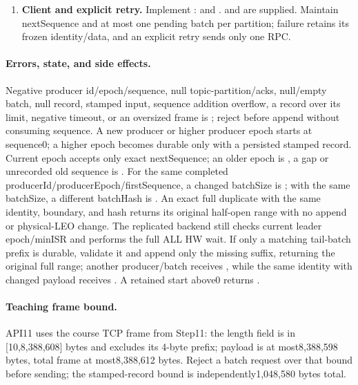 \begin{enumerate}
\item \textbf{Client and explicit retry.} Implement :  and .  and  are supplied. Maintain nextSequence and at most one pending batch per partition; failure retains its frozen identity/data, and an explicit retry sends only one RPC.
\end{enumerate}
\paragraph{Errors, state, and side effects.}Negative producer id/epoch/sequence, null topic-partition/acks, null/empty batch, null record, stamped input, sequence addition overflow, a record over its limit, negative timeout, or an oversized frame is ; reject before append without consuming sequence. A new producer or higher producer epoch starts at sequence0; a higher epoch becomes durable only with a persisted stamped record. Current epoch accepts only exact nextSequence; an older epoch is , a gap or unrecorded old sequence is . For the same completed producerId/producerEpoch/firstSequence, a changed batchSize is ; with the same batchSize, a different batchHash is . An exact full duplicate with the same identity, boundary, and hash returns its original half-open \pathcode{[firstOffset,nextOffset)} range with no append or physical-LEO change. The replicated backend still checks current leader epoch/minISR and performs the full ALL HW wait. If only a matching tail-batch prefix is durable, validate it and append only the missing suffix, returning the original full range; another producer/batch receives , while the same identity with changed payload receives . A retained start above0 returns .
\paragraph{Teaching frame bound.}API11 uses the course TCP frame from Step11: the length field is in [10,8,388,608] bytes and excludes its 4-byte prefix; payload is at most8,388,598 bytes, total frame at most8,388,612 bytes. Reject a batch request over that bound before sending; the stamped-record bound is independently1,048,580 bytes total.
